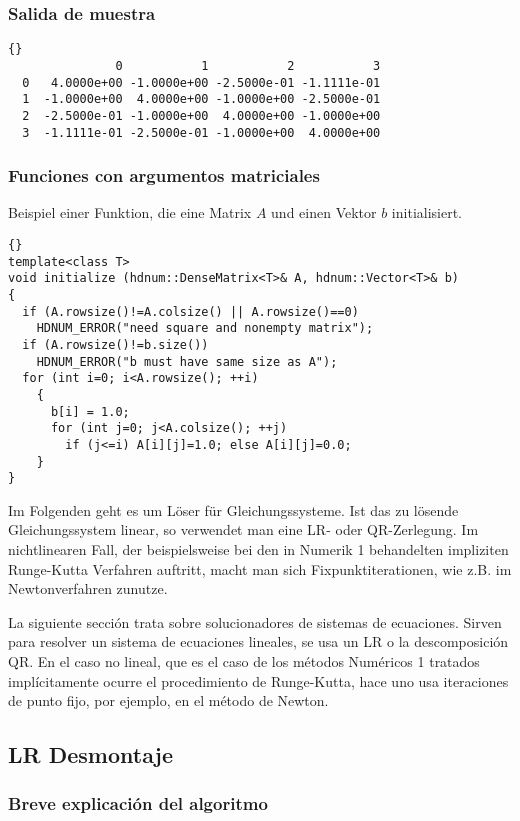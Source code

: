 \documentclass[a4paper,11pt]{article}
\theoremstyle{definition}
\begin{document}
\begin{frame}[fragile]
\frametitle{Salida de muestra}
{\footnotesize{\begin{lstlisting}{}
               0           1           2           3
  0   4.0000e+00 -1.0000e+00 -2.5000e-01 -1.1111e-01
  1  -1.0000e+00  4.0000e+00 -1.0000e+00 -2.5000e-01
  2  -2.5000e-01 -1.0000e+00  4.0000e+00 -1.0000e+00
  3  -1.1111e-01 -2.5000e-01 -1.0000e+00  4.0000e+00
\end{lstlisting}}}
\end{frame}

\begin{frame}[fragile]
\frametitle{Funciones con argumentos matriciales}
Beispiel einer Funktion, die eine Matrix $A$ und einen Vektor $b$
initialisiert.

{\footnotesize{\begin{lstlisting}{}
template<class T>
void initialize (hdnum::DenseMatrix<T>& A, hdnum::Vector<T>& b)
{
  if (A.rowsize()!=A.colsize() || A.rowsize()==0)
    HDNUM_ERROR("need square and nonempty matrix");
  if (A.rowsize()!=b.size())
    HDNUM_ERROR("b must have same size as A");
  for (int i=0; i<A.rowsize(); ++i)
    {
      b[i] = 1.0;
      for (int j=0; j<A.colsize(); ++j)
        if (j<=i) A[i][j]=1.0; else A[i][j]=0.0;
    }
}
\end{lstlisting}}}
\end{frame}

Im Folgenden geht es um Löser für Gleichungssysteme. Ist das zu
lösende Gleichungssystem linear, so verwendet man eine LR- oder
QR-Zerlegung. Im nichtlinearen Fall, der beispielsweise bei den in
Numerik 1 behandelten impliziten Runge-Kutta Verfahren auftritt, macht
man sich Fixpunktiterationen, wie z.B. im Newtonverfahren zunutze.

La siguiente sección trata sobre solucionadores  de sistemas de ecuaciones. 
Sirven para resolver un sistema de ecuaciones lineales, se usa un LR o la 
descomposición QR. En el caso no lineal, que es el caso de los métodos
Numéricos 1 tratados implícitamente ocurre el procedimiento de Runge-Kutta, hace
uno usa iteraciones de punto fijo, por ejemplo, en el método de Newton.

\subsection{LR Desmontaje}

\subsubsection{Breve explicación del algoritmo}
\end{document}
